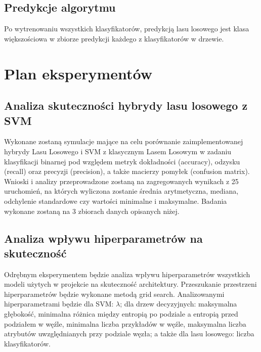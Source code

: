\documentclass[
    left=2.5cm,         %
    right=2.5cm,        %
    top=2.5cm,          %
    bottom=3cm,         %
    bindingoffset=6mm,  %
    nohyphenation=false %
]{eiti/eiti-report}
\begin{document}
\subsection{Predykcje algorytmu}
Po wytrenowaniu wszystkich klasyfikatorów, predykcją lasu losowego jest klasa większościowa w zbiorze predykcji każdego z klasyfikatorów w drzewie.
\newpage
\section{Plan eksperymentów}
\subsection{Analiza skuteczności hybrydy lasu losowego z SVM}
Wykonane zostaną symulacje mające na celu porównanie zaimplementowanej hybrydy Lasu Losowego i SVM z klasycznym Lasem Losowym w zadaniu klasyfikacji binarnej pod względem metryk dokładności (accuracy), odzysku (recall) oraz precyzji (precision), a także macierzy pomyłek (confusion matrix). Wnioski i analizy przeprowadzone zostaną na zagregowanych wynikach z 25 uruchomień, na których wyliczona zostanie średnia arytmetyczna, mediana, odchylenie standardowe czy wartości minimalne i maksymalne. Badania wykonane zostaną na 3 zbiorach danych opisanych niżej.

\subsection{Analiza wpływu hiperparametrów na skuteczność}
Odrębnym eksperymentem będzie analiza wpływu hiperparametrów wszystkich modeli użytych w projekcie na skuteczność architektury. Przeszukanie przestrzeni hiperparametrów będzie wykonane metodą grid search. Analizowanymi hiperparametrami będzie dla SVM: $\lambda$; dla drzew decyzyjnych: maksymalna głębokość, minimalna różnica między entropią po podziale a entropią przed podziałem w węźle, minimalna liczba przykładów w węźle, maksymalna liczba atrybutów uwzględnianych przy podziale węzła; a także dla lasu losowego: liczba klasyfikatorów.
\end{document}
